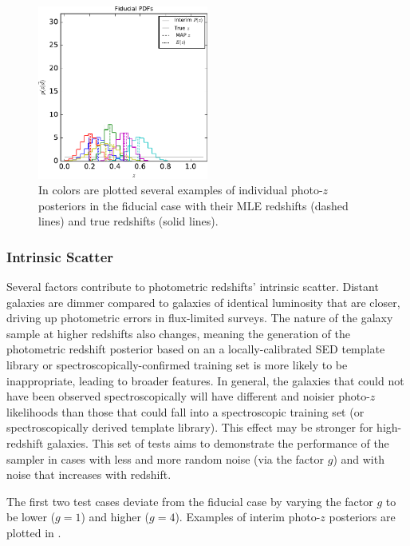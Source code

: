 \begin{figure}
	\includegraphics[width=0.5\textwidth]{figures/chippr/sig2_samplepzs.pdf}
	\caption{In colors are plotted several examples of individual photo-$z$ posteriors in the fiducial case with their MLE redshifts (dashed lines) and true redshifts (solid lines).}
\end{figure}

\subsubsection{Intrinsic Scatter}

Several factors contribute to photometric redshifts' intrinsic scatter.  
Distant galaxies are dimmer compared to galaxies of identical luminosity that are closer, driving up photometric errors in flux-limited surveys.  
The nature of the galaxy sample at higher redshifts also changes, meaning the generation of the photometric redshift posterior based on an a locally-calibrated SED template library or spectroscopically-confirmed training set is more likely to be inappropriate, leading to broader features.  
In general, the galaxies that could not have been observed spectroscopically will have different and noisier photo-$z$ likelihoods than those that could fall into a spectroscopic training set (or spectroscopically derived template library).  
This effect may be stronger for high-redshift galaxies.  
This set of tests aims to demonstrate the performance of the sampler in cases with less and more random noise (via the factor $g$) and with noise that increases with redshift.

The first two test cases deviate from the fiducial case by varying the factor $g$ to be lower ($g=1$) and higher ($g=4$).  
Examples of interim photo-$z$ posteriors are plotted in .


